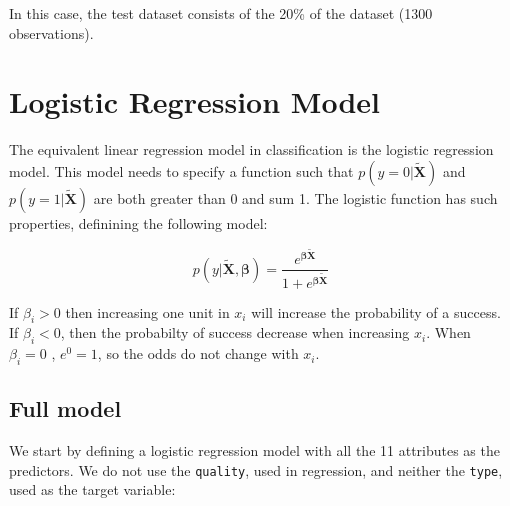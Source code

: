 \documentclass[12pt,]{article}
\newenvironment{Shaded}{\begin{snugshade}}{\end{snugshade}}
\newcommand{\KeywordTok}[1]{\textcolor[rgb]{0.13,0.29,0.53}{\textbf{{#1}}}}
\newcommand{\DataTypeTok}[1]{\textcolor[rgb]{0.13,0.29,0.53}{{#1}}}
\newcommand{\DecValTok}[1]{\textcolor[rgb]{0.00,0.00,0.81}{{#1}}}
\newcommand{\FloatTok}[1]{\textcolor[rgb]{0.00,0.00,0.81}{{#1}}}
\newcommand{\StringTok}[1]{\textcolor[rgb]{0.31,0.60,0.02}{{#1}}}
\newcommand{\CommentTok}[1]{\textcolor[rgb]{0.56,0.35,0.01}{\textit{{#1}}}}
\newcommand{\OtherTok}[1]{\textcolor[rgb]{0.56,0.35,0.01}{{#1}}}
\newcommand{\NormalTok}[1]{{#1}}
\begin{document}
\begin{Shaded}
\end{Shaded}

In this case, the test dataset consists of the 20\% of the dataset (1300
observations).

\section{Logistic Regression Model}\label{logistic-regression-model}

The equivalent linear regression model in classification is the logistic
regression model. This model needs to specify a function such that
\(p(y=0|\bm{\tilde{X}})\) and \(p(y=1|\bm{\tilde{X}})\) are both greater
than 0 and sum 1. The logistic function has such properties, definining
the following model:

\[ p(y|\bm{\tilde{X}},\bm{\beta}) = \frac{e^{\bm{\beta} \bm{\tilde{X}}}}{1+e^{\bm{\beta} \bm{\tilde{X}}}} \]

If \(\beta_i > 0\) then increasing one unit in \(x_i\) will increase the
probability of a success. If \(\beta_i < 0\), then the probabilty of
success decrease when increasing \(x_i\). When \(\beta_i = 0\) ,
\(e^0 = 1\), so the odds do not change with \(x_i\).

\subsection{Full model}\label{full-model}

We start by defining a logistic regression model with all the 11
attributes as the predictors. We do not use the \texttt{quality}, used
in regression, and neither the \texttt{type}, used as the target
variable:
\end{document}
